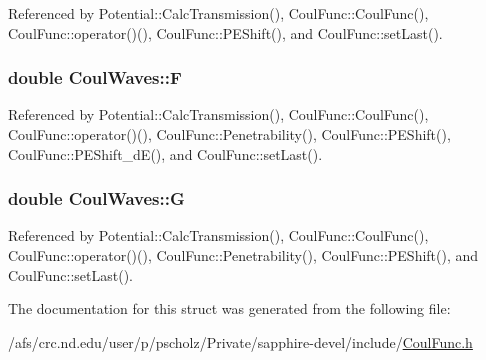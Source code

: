 Referenced by Potential\-::\-Calc\-Transmission(), Coul\-Func\-::\-Coul\-Func(), Coul\-Func\-::operator()(), Coul\-Func\-::\-P\-E\-Shift(), and Coul\-Func\-::set\-Last().

\hypertarget{structCoulWaves_ad04a2d9552d7cfc775f35cd179000553}{
\subsubsection[{F}]{\setlength{\rightskip}{0pt plus 5cm}double Coul\-Waves\-::\-F}}\label{structCoulWaves_ad04a2d9552d7cfc775f35cd179000553}


Referenced by Potential\-::\-Calc\-Transmission(), Coul\-Func\-::\-Coul\-Func(), Coul\-Func\-::operator()(), Coul\-Func\-::\-Penetrability(), Coul\-Func\-::\-P\-E\-Shift(), Coul\-Func\-::\-P\-E\-Shift\-\_\-d\-E(), and Coul\-Func\-::set\-Last().

\hypertarget{structCoulWaves_a6ed564ba02c1d0b75b2453f8129eae48}{
\subsubsection[{G}]{\setlength{\rightskip}{0pt plus 5cm}double Coul\-Waves\-::\-G}}\label{structCoulWaves_a6ed564ba02c1d0b75b2453f8129eae48}


Referenced by Potential\-::\-Calc\-Transmission(), Coul\-Func\-::\-Coul\-Func(), Coul\-Func\-::operator()(), Coul\-Func\-::\-Penetrability(), Coul\-Func\-::\-P\-E\-Shift(), and Coul\-Func\-::set\-Last().



The documentation for this struct was generated from the following file\-:\begin{DoxyCompactItemize}
\item 
/afs/crc.\-nd.\-edu/user/p/pscholz/\-Private/sapphire-\/devel/include/\hyperlink{CoulFunc_8h}{Coul\-Func.\-h}\end{DoxyCompactItemize}
